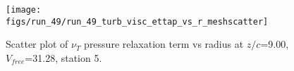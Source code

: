 \begin{figure}[H]
\centering
\texttt{[image: figs/run\_49/run\_49\_turb\_visc\_ettap\_vs\_r\_meshscatter]}
\caption{Scatter plot of $\nu_T$ pressure relaxation term vs radius at $z/c$=9.00, $V_{free}$=31.28, station 5.}
\label{fig:run_49_turb_visc_ettap_vs_r_meshscatter}
\end{figure}


